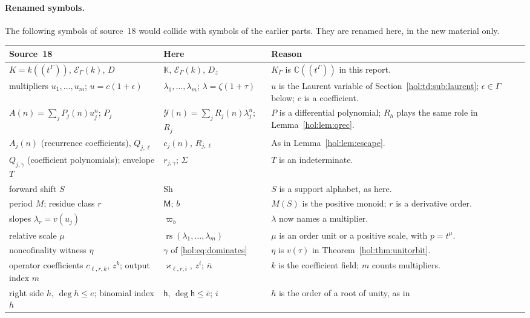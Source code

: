 \documentclass[11pt]{article}
\numberwithin{equation}{section}
\theoremstyle{definition}
\theoremstyle{remark}
\newcommand{\C}{\mathbb C}
\newcommand{\K}{K_\Gamma}
\newcommand{\KK}{\mathbb K}
\newcommand{\EK}{\mathcal E_\Gamma(k)}
\begin{document}
\paragraph{Renamed symbols.}
The following symbols of source~18 would collide with symbols of the earlier
parts. They are renamed here, in the new material only.
{\small
\begin{longtable}{@{}>{\raggedright\arraybackslash}p{}
>{\raggedright\arraybackslash}p{}
>{\raggedright\arraybackslash}p{}@{}}
\toprule
Source~18 & Here & Reason\\
\midrule
\endhead
$K=k((t^\Gamma))$, $\mathcal E_\Gamma(k)$, $D$ & $\KK$, $\EK$, $D_z$ & $\K$
is $\C((t^\Gamma))$ in this report.\\
multipliers $u_1,\ldots,u_m$; $u=c(1+\epsilon)$ & $\lambda_1,\ldots,\lambda_m$;
$\lambda=\zeta(1+\tau)$ & $u$ is the Laurent variable of
Section~\ref{hol:td:sub:laurent}; $\epsilon\in\Gamma$ below; $c$ is a
coefficient.\\
$A(n)=\sum_jP_j(n)u_j^n$; $P_j$ & $\mathcal Y(n)=\sum_jR_j(n)\lambda_j^n$;
$R_j$ & $P$ is a differential polynomial; $R_h$ plays the same role in
Lemma~\ref{hol:lem:qrec}.\\
$A_j(n)$ (recurrence coefficients), $Q_{j,\ell}$ & $c_j(n)$, $R_{j,\ell}$ & As
in Lemma~\ref{hol:lem:escape}.\\
$Q_{j,\gamma}$ (coefficient polynomials); envelope $T$ & $r_{j,\gamma}$;
$\Sigma$ & $T$ is an indeterminate.\\
forward shift $S$ & $\mathrm{Sh}$ & $S$ is a support alphabet, as here.\\
period $M$; residue class $r$ & $\mathsf M$; $b$ & $M(S)$ is the positive
monoid; $r$ is a derivative order.\\
slopes $\lambda_r=v(u_j)$ & $\varpi_b$ & $\lambda$ now names a multiplier.\\
relative scale $\mu$ & $\operatorname{rs}(\lambda_1,\ldots,\lambda_m)$ & $\mu$
is an order unit or a positive scale, with $p=t^\mu$.\\
noncofinality witness $\eta$ & $\gamma$ of \eqref{hol:eq:dominates} & $\eta$ is
$v(\tau)$ in Theorem~\ref{hol:thm:unitorbit}.\\
operator coefficients $c_{\ell,r,k}$, $z^k$; output index $m$ &
$\varkappa_{\ell,r,i}$, $z^i$; $\bar n$ & $k$ is the coefficient field; $m$
counts multipliers.\\
right side $h$, $\deg h\le e$; binomial index $h$ & $\mathsf h$,
$\deg\mathsf h\le\bar e$; $i$ & $h$ is the order of a root of unity, as in

\end{longtable}}
\end{document}

